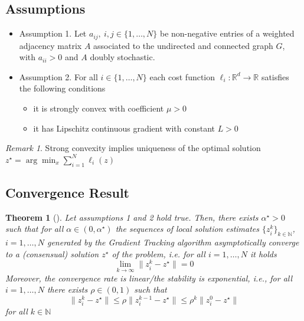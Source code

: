 \documentclass{book}
\newcommand{\R}{\mathbb{R}}
\newcommand{\N}{\mathbb{N}}
\theoremstyle{theoremv2}
\newtheorem{theorem}{Theorem}[chapter]
\theoremstyle{defv2}
\theoremstyle{remark}
\newtheorem*{remark}{Remark}
\theoremstyle{remark}
\theoremstyle{definition}
\theoremstyle{definition}
\begin{document}
\subsection{Assumptions}
\begin{itemize}
    \item Assumption 1. Let $a_{ij},\ i,j\in\{1,\dots,N\}$ be non-negative entries of a weighted adjacency matrix $A$ associated to the undirected and connected graph $G$, with $a_{ii}>0$ and $A$ doubly stochastic.
    \item Assumption 2. For all $i\in\{1,\dots,N\}$ each cost function $\ell_i:\R^d\to\R$ satisfies the following conditions
        \begin{itemize}
            \item it is strongly convex with coefficient $\mu>0$
            \item it has Lipschitz continuous gradient with constant $L>0$
        \end{itemize}
\end{itemize}
\begin{remark}
    Strong convexity implies uniqueness of the optimal solution $z^\star = \arg\min_x \displaystyle\sum_{i=1}^{N} \ell_i(z)$
\end{remark}
\subsection{Convergence Result}
\begin{theorem}[]
    Let assumptions 1 and 2 hold true. Then, there exists $\alpha^\star>0$ such that for all $\alpha\in(0,\alpha^\star)$ the sequences of local solution estimates $\{z_i^k\}_{k\in\N}$, $i=1,\dots,N$ generated by the Gradient Tracking algorithm asymptotically converge to a (consensual) solution $z^\star$ of the problem, i.e. for all $i=1,\dots,N$ it holds
    \[
        \lim_{k\to\infty} \|z_i^k-z^\star\| = 0
    \]
    Moreover, the convergence rate is linear/the stability is exponential, i.e., for all $i=1,\dots,N$ there exists $\rho\in(0,1)$ such that 
    \[
        \|z_i^k-z^\star\| \leq \rho \|z_i^{k-1}-z^\star\| \leq \rho^k \|z_i^0-z^\star\|
    \]
    for all $k\in\N$
\end{theorem}
\end{document}
